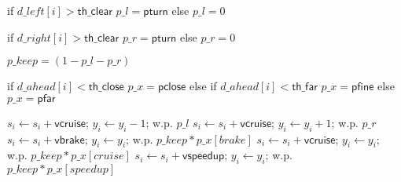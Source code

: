 if $\mathit{d\_left}[i] > \mathsf{th\_clear}$
		$\mathit{p\_l} = \mathsf{pturn}$
else
		$\mathit{p\_l} = 0$

if $\mathit{d\_right}[i] > \mathsf{th\_clear}$
		$\mathit{p\_r} = \mathsf{pturn}$
else
		$\mathit{p\_r} = 0$

$\mathit{p\_keep} = (1 - \mathit{p\_l} - \mathit{p\_r})$

if $\mathit{d\_ahead}[i] < \mathsf{th\_close}$
		$\mathit{p\_x} = \mathsf{pclose}$
else if $\mathit{d\_ahead}[i] < \mathsf{th\_far}$
		$\mathit{p\_x} = \mathsf{pfine}$
else
		$\mathit{p\_x} = \mathsf{pfar}$

$s_i \gets s_i + \mathsf{vcruise}$; $y_i \gets y_i - 1$; w.p. $\mathit{p\_l}$
$s_i \gets s_i + \mathsf{vcruise}$; $y_i \gets y_i + 1$; w.p. $\mathit{p\_r}$
$s_i \gets s_i + \mathsf{vbrake}$; $y_i \gets y_i$; w.p. $\mathit{p\_keep} * \mathit{p\_x}[brake]$
$s_i \gets s_i + \mathsf{vcruise}$; $y_i \gets y_i$; w.p. $\mathit{p\_keep} * \mathit{p\_x}[cruise]$
$s_i \gets s_i + \mathsf{vspeedup}$; $y_i \gets y_i$; w.p. $\mathit{p\_keep} * \mathit{p\_x}[speedup]$

